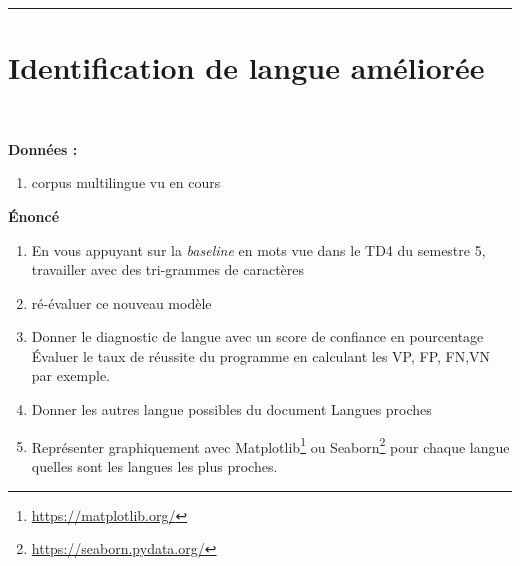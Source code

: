 \newcommand{\numTD}{TD1}
\newcommand{\themeTD}{Analyse en caractères}
\newcommand{\file}{toto.tex}



\hrule

\noindent{}
\newline
\section{Identification de langue améliorée}
~\\
\vspace{-1cm}

\textbf{Données :}
\begin{enumerate}
  \item corpus multilingue vu en cours
\end{enumerate}

\textbf{Énoncé}

\begin{enumerate}
  \item En vous appuyant sur la \textit{baseline} en mots vue dans le TD4 du semestre 5, travailler avec des tri-grammes de caractères
  \item ré-évaluer ce nouveau modèle
  \item Donner le diagnostic de langue avec un score de confiance en pourcentage\\
   Évaluer le taux de réussite du programme en calculant les VP, FP, FN,VN par exemple.
  \item Donner les autres langue possibles du document  Langues proches
  \item Représenter graphiquement avec Matplotlib\footnote{\url{https://matplotlib.org/}} ou Seaborn\footnote{\url{https://seaborn.pydata.org/}} pour chaque langue quelles sont les langues les plus proches.
\end{enumerate}


